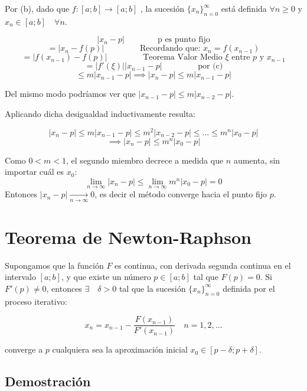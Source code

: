 \documentclass[openany]{book}
\begin{document}
\begin{enumerate}
  Por (b), dado que \(f:[a; b] \rightarrow [a; b]\) , la sucesión \(\{x_n\}_{n=0}^{\infty}\) está definida \(\forall n \geq 0\) y \(x_n \in [a; b] \quad \forall n\).

  \[|x_n - p| \qquad \qquad \text{p es punto fijo}\]
  \[=|x_n - f(p)| \qquad \qquad \text{ Recordando que: } x_n=f(x_{n-1})\]
  \[=|f(x_{n-1}) - f(p)| \qquad \qquad \text{ Teorema Valor Medio } \xi \text{ entre } p \text{ y } x_{n-1}\]
  \[=|f'(\xi)| |x_{n-1} - p| \qquad \qquad \text{ por (c)}\]
  \[\leq m |x_{n-1} - p| \implies |x_n - p| \leq m |x_{n-1} - p|\]

  Del mismo modo podríamos ver que \(|x_{n-1} - p| \leq m |x_{n-2} - p|\).

  Aplicando dicha desigualdad inductivamente resulta:

  \[ |x_n - p| \leq m |x_{n-1} - p| \leq m^2 |x_{n-2} - p| \leq \dots \leq m^n |x_0 - p|\]
  \[\implies |x_n - p| \leq m^n |x_0 - p|\]

  Como \(0<m<1\), el segundo miembro decrece a medida que \(n\) aumenta, sin importar cuál es \(x_0\):
  \[\lim_{n \to \infty} |x_n - p| \leq \lim_{n \to \infty} m^n |x_0 - p| = 0\]
  Entonces \(|x_n - p| \xrightarrow[n \to \infty]{} 0\), es decir el método converge hacia el punto fijo \(p\).
\end{enumerate}

\hypertarget{teorema-de-newton-raphson-1}{%
\section*{Teorema de Newton-Raphson}\label{teorema-de-newton-raphson-1}}

Supongamos que la función \(F\) es continua, con derivada segunda continua en el intervalo \([a; b]\), y que existe un número \(p \in [a; b]\) tal que \(F(p) = 0\). Si \(F'(p) \neq 0\), entonces \(\exists \quad \delta > 0\) tal que la sucesión \(\{x_n\}_{n=0}^{\infty}\) definida por el proceso iterativo:

\begin{equation}
\label{reglagral}
x_n = x_{n-1} - \frac{F(x_{n-1})}{F'(x_{n-1})} \quad n=1,2,\dots
\end{equation}

converge a \(p\) cualquiera sea la aproximación inicial \(x_0 \in [p-\delta; p+\delta]\).

\hypertarget{demostraciuxf3n-1}{%
\subsection*{Demostración}\label{demostraciuxf3n-1}}
\end{document}
